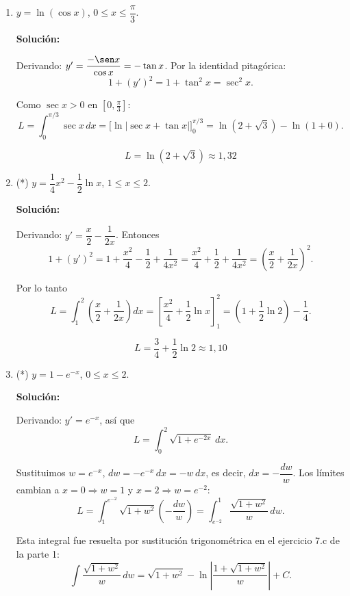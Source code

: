 \documentclass[12pt]{article}
\newcommand{\solucion}{%
    \vspace{0.8em}%
    \textbf{Solución:}%
}
\begin{document}
\begin{enumerate}[label=\alph*.-]
    Por lo tanto
    \[
    L=\int_{1}^{9}\frac12\left(y^{1/2}+y^{-1/2}\right)dy
    =\frac12\left[\frac23y^{3/2}+2y^{1/2}\right]_{1}^{9},
    \]
    \[
    L=\frac12\left[(18+6)-\left(\frac23+2\right)\right]
    =\frac12\cdot\frac{64}{3}.
    \]

    \[
    \boxed{
    L=\frac{32}{3}
    }
    \]


    \item $y=\ln(\cos x)$, \quad $0\le x\le\dfrac\pi3$.

    \solucion

    Derivando: $y'=\dfrac{-\sen x}{\cos x}=-\tan x$. Por la identidad
    pitagórica:
    \[
    1+(y')^2=1+\tan^2x=\sec^2x.
    \]

    Como $\sec x>0$ en $\left[0,\frac\pi3\right]$:
    \[
    L=\int_{0}^{\pi/3}\sec x\,dx
    =\Big[\ln|\sec x+\tan x|\Big]_{0}^{\pi/3}
    =\ln\left(2+\sqrt3\right)-\ln(1+0).
    \]

    \[
    \boxed{
    L=\ln\left(2+\sqrt3\right)\approx1{,}32
    }
    \]


    \item (*) $y=\dfrac14x^2-\dfrac12\ln x$, \quad $1\le x\le2$.

    \solucion

    Derivando: $y'=\dfrac x2-\dfrac{1}{2x}$. Entonces
    \[
    1+(y')^2=1+\frac{x^2}{4}-\frac12+\frac{1}{4x^2}
    =\frac{x^2}{4}+\frac12+\frac{1}{4x^2}
    =\left(\frac x2+\frac{1}{2x}\right)^2.
    \]

    Por lo tanto
    \[
    L=\int_{1}^{2}\left(\frac x2+\frac{1}{2x}\right)dx
    =\left[\frac{x^2}{4}+\frac12\ln x\right]_{1}^{2}
    =\left(1+\frac12\ln2\right)-\frac14.
    \]

    \[
    \boxed{
    L=\frac34+\frac12\ln2\approx1{,}10
    }
    \]


    \item (*) $y=1-e^{-x}$, \quad $0\le x\le2$.

    \solucion

    Derivando: $y'=e^{-x}$, así que
    \[
    L=\int_{0}^{2}\sqrt{1+e^{-2x}}\,dx.
    \]

    Sustituimos $w=e^{-x}$, $dw=-e^{-x}\,dx=-w\,dx$, es decir,
    $dx=-\dfrac{dw}{w}$. Los límites cambian a $x=0\Rightarrow w=1$ y
    $x=2\Rightarrow w=e^{-2}$:
    \[
    L=\int_{1}^{e^{-2}}\sqrt{1+w^2}\left(-\frac{dw}{w}\right)
    =\int_{e^{-2}}^{1}\frac{\sqrt{1+w^2}}{w}\,dw.
    \]

    Esta integral fue resuelta por sustitución trigonométrica en el
    ejercicio 7.c de la parte 1:
    \[
    \int\frac{\sqrt{1+w^2}}{w}\,dw
    =\sqrt{1+w^2}-\ln\left|\frac{1+\sqrt{1+w^2}}{w}\right|+C.
    \]


\end{enumerate}
\end{document}
